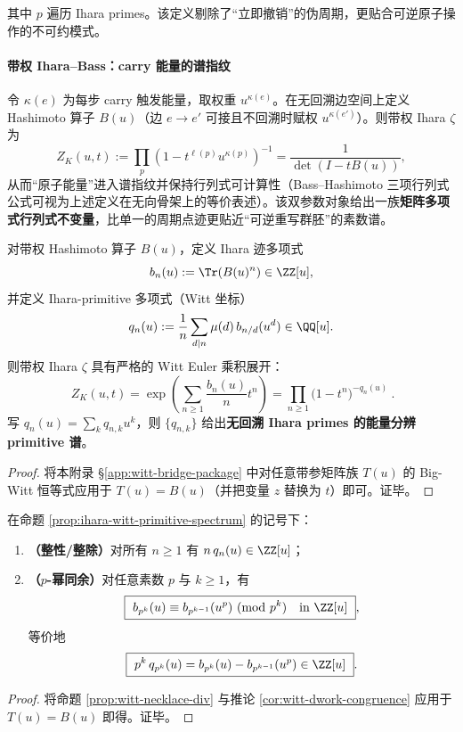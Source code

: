 其中 $p$ 遍历 Ihara primes。该定义剔除了“立即撤销”的伪周期，更贴合可逆原子操作的不可约模式。

\paragraph{带权 Ihara--Bass：carry 能量的谱指纹}
令 $\kappa(e)$ 为每步 carry 触发能量，取权重 $u^{\kappa(e)}$。在无回溯边空间上定义 Hashimoto 算子 $B(u)$（边 $e\to e'$ 可接且不回溯时赋权 $u^{\kappa(e')}$）。则带权 Ihara \(\zeta\) 为
\[
Z_K(u,t):=\prod_{p}\left(1-t^{\ell(p)}u^{\kappa(p)}\right)^{-1}
=\frac{1}{\det(I-tB(u))},
\]
从而“原子能量”进入谱指纹并保持行列式可计算性（Bass--Hashimoto 三项行列式公式可视为上述定义在无向骨架上的等价表述）。该双参数对象给出一族\textbf{矩阵多项式行列式不变量}，比单一的周期点迹更贴近“可逆重写群胚”的素数谱。

\begin{proposition}\label{prop:ihara-witt-primitive-spectrum}
对带权 Hashimoto 算子 \(B(u)\)，定义 Ihara 迹多项式
\[
b_n(u):=\Tr(B(u)^n)\in\ZZ[u],
\]
并定义 Ihara-primitive 多项式（Witt 坐标）
\[
q_n(u):=\frac{1}{n}\sum_{d\mid n}\mu(d)\,b_{n/d}(u^d)\in\QQ[u].
\]
则带权 Ihara \(\zeta\) 具有严格的 Witt Euler 乘积展开：
\[
\boxed{\ 
Z_K(u,t)
=\exp\!\left(\sum_{n\ge 1}\frac{b_n(u)}{n}t^n\right)
=\prod_{n\ge 1}\bigl(1-t^n\bigr)^{-q_n(u)}
\ }.
\]
写 \(q_n(u)=\sum_k q_{n,k}u^k\)，则 \(\{q_{n,k}\}\) 给出\textbf{无回溯 Ihara primes 的能量分辨 primitive 谱}。
\end{proposition}
\begin{proof}
将本附录 \S\ref{app:witt-bridge-package} 中对任意带参矩阵族 \(T(u)\) 的 Big-Witt 恒等式应用于 \(T(u)=B(u)\)（并把变量 \(z\) 替换为 \(t\)）即可。证毕。
\end{proof}

\begin{corollary}\label{cor:ihara-witt-dwork}
在命题 \ref{prop:ihara-witt-primitive-spectrum} 的记号下：
\begin{enumerate}
  \item \textbf{（整性/整除）}对所有 \(n\ge 1\) 有 \(n\,q_n(u)\in\ZZ[u]\)；
  \item \textbf{（\(p\)-幂同余）}对任意素数 \(p\) 与 \(k\ge 1\)，有
  \[
  \boxed{\ b_{p^k}(u)\equiv b_{p^{k-1}}(u^p)\ (\mathrm{mod}\ p^k)\quad\text{in }\ZZ[u]\ },
  \]
  等价地
  \[
  \boxed{\ p^k\,q_{p^k}(u)=b_{p^k}(u)-b_{p^{k-1}}(u^p)\in\ZZ[u]\ }.
\]
\end{enumerate}
\end{corollary}
\begin{proof}
将命题 \ref{prop:witt-necklace-div} 与推论 \ref{cor:witt-dwork-congruence} 应用于 \(T(u)=B(u)\) 即得。证毕。
\end{proof}

